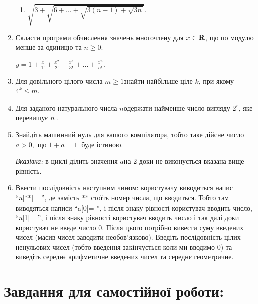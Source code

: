 \documentclass[a5paper,titlepage,openany,twoside,draft]{book_unv}%
\makeatletter
\newcommand{\xslalph}[1]{\expandafter\@xslalph\csname c@#1\endcsname}
\newcommand{\@xslalph}[1]{%
    \ifcase#1\or а\or б\or в\or г\or д\or e\or є\or ж\or з\or i%
    \or й\or к\or л\or м\or н\or о\or п\or р\or с\or т%
    \or у\or ф\or х\or ц\or ч\or ш\or ю\or я\or аа\or бб\or вв%
    \else\@ctrerr\fi%
}
\makeatother
\begin{document}
\begin{enumerate}
\begin{enumerate}[label=\xslalph*)]
\item
 \(\sqrt{3 + \sqrt{6 + \ldots + \sqrt{3(n - 1) + \sqrt{3n}}}}.\)

\end{enumerate}

\item
  Скласти програми обчислення значень многочлену для 
  \(x \in \bf{R}\), що по модулю менше за одиницю та
  \( n \geq 0\):

\(y = 1 + \frac{x}{1!} + \frac{x^{2}}{2!} + \frac{x^{3}}{3!} + \ldots + \frac{x^{n}}{n!} \).

\item
  Для довільного цілого числа \(m \geq 1\)знайти найбільше ціле \(k\),
  при якому \(4^{k} \leq m\).
\item
  Для заданого натурального числа \(n\)одержати найменше число вигляду
  \(2^{r}\), яке перевищує \(n\) .
\item
  Знайдіть машинний нуль для вашого компілятора, тобто таке дійсне число
  \(a > 0,\) що \(1 + a = 1\ \) буде істиною.

\emph{Вказівка:} в циклі ділить значення \(a\)на 2 доки не виконується
вказана вище рівність.

\item
  Ввести послідовність наступним чином: користувачу виводиться напис
  ``a{[}**{]}= '', де замість ** стоїть номер числа, що вводиться. Тобто
  там виводяться написи ``a{[}0{]}= '', і після знаку рівності
  користувач вводить число, ``a{[}1{]}= '', і після знаку рівності
  користувач вводить число і так далі доки користувач не введе число 0.
  Після цього потрібно вивести суму введених чисел (масив чисел заводити
  необов'язково). Введіть послідовність цілих ненульових чисел (тобто введення
  закінчується коли ми вводимо 0) та виведіть середнє арифметичне
  введених чисел та середнє геометричне.

\end{enumerate}

\section{Завдання для самостійної роботи:}
\end{document}
